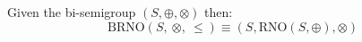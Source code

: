 Given the bi-semigroup $(S , \oplus, \otimes)$ then:
\[
\mathrm{BRNO}(S,\ \otimes,\ \leq) \equiv (S, \mathrm{RNO}(S, \oplus), \otimes)
\]

